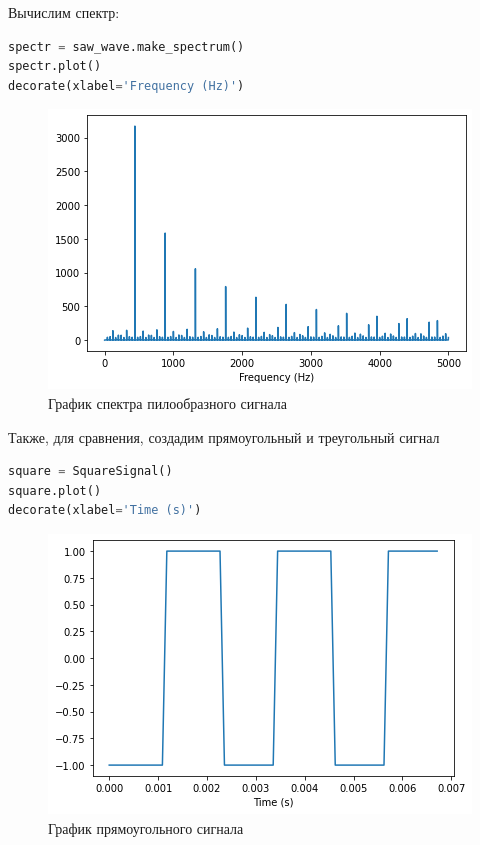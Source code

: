 Вычислим спектр:

\begin{lstlisting}[language=Python]
spectr = saw_wave.make_spectrum()
spectr.plot()
decorate(xlabel='Frequency (Hz)')
\end{lstlisting}

\begin{figure}[H]
	\begin{center}
		\includegraphics[scale=1]{fig/lab02/lab02_02.png}
		\caption{График спектра пилообразного сигнала}
	\end{center}
\end{figure}

Также, для сравнения, создадим прямоугольный и треугольный сигнал

\begin{lstlisting}[language=Python]
square = SquareSignal()
square.plot()
decorate(xlabel='Time (s)')
\end{lstlisting}

\begin{figure}[H]
	\begin{center}
		\includegraphics[scale=1]{fig/lab02/lab02_03.png}
		\caption{График прямоугольного сигнала}
	\end{center}
\end{figure}

